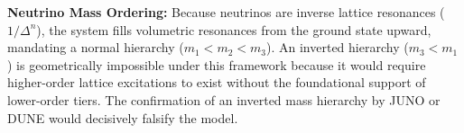     \item \textbf{Neutrino Mass Ordering:} Because neutrinos are inverse lattice resonances ($1/\Delta^n$), the system fills volumetric resonances from the ground state upward, mandating a normal hierarchy ($m_1 < m_2 < m_3$). An inverted hierarchy ($m_3 < m_1$) is geometrically impossible under this framework because it would require higher-order lattice excitations to exist without the foundational support of lower-order tiers. The confirmation of an inverted mass hierarchy by JUNO or DUNE would decisively falsify the model.
    